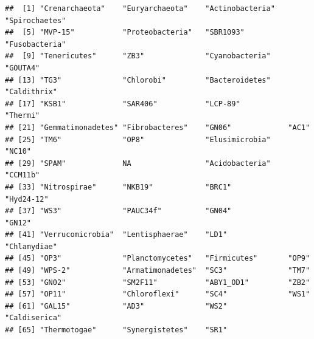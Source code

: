 \documentclass[
]{book}
\newenvironment{Shaded}{\begin{snugshade}}{\end{snugshade}}
\newcommand{\CommentTok}[1]{\textcolor[rgb]{0.56,0.35,0.01}{\textit{#1}}}
\newcommand{\FunctionTok}[1]{\textcolor[rgb]{0.00,0.00,0.00}{#1}}
\newcommand{\NormalTok}[1]{#1}
\newcommand{\SpecialCharTok}[1]{\textcolor[rgb]{0.00,0.00,0.00}{#1}}
\begin{document}
\begin{verbatim}
##  [1] "Crenarchaeota"    "Euryarchaeota"    "Actinobacteria"   "Spirochaetes"    
##  [5] "MVP-15"           "Proteobacteria"   "SBR1093"          "Fusobacteria"    
##  [9] "Tenericutes"      "ZB3"              "Cyanobacteria"    "GOUTA4"          
## [13] "TG3"              "Chlorobi"         "Bacteroidetes"    "Caldithrix"      
## [17] "KSB1"             "SAR406"           "LCP-89"           "Thermi"          
## [21] "Gemmatimonadetes" "Fibrobacteres"    "GN06"             "AC1"             
## [25] "TM6"              "OP8"              "Elusimicrobia"    "NC10"            
## [29] "SPAM"             NA                 "Acidobacteria"    "CCM11b"          
## [33] "Nitrospirae"      "NKB19"            "BRC1"             "Hyd24-12"        
## [37] "WS3"              "PAUC34f"          "GN04"             "GN12"            
## [41] "Verrucomicrobia"  "Lentisphaerae"    "LD1"              "Chlamydiae"      
## [45] "OP3"              "Planctomycetes"   "Firmicutes"       "OP9"             
## [49] "WPS-2"            "Armatimonadetes"  "SC3"              "TM7"             
## [53] "GN02"             "SM2F11"           "ABY1_OD1"         "ZB2"             
## [57] "OP11"             "Chloroflexi"      "SC4"              "WS1"             
## [61] "GAL15"            "AD3"              "WS2"              "Caldiserica"     
## [65] "Thermotogae"      "Synergistetes"    "SR1"
\end{verbatim}

\begin{Shaded}
\end{Shaded}
\end{document}
